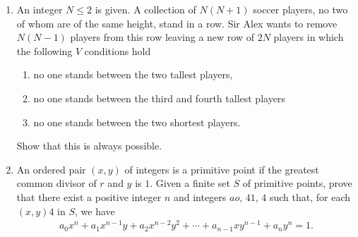 \documentclass[12pt,-letter paper]{article}
\begin{document}
\begin{enumerate}
\item An integer $N\leq2$ is given. A collection of $N(N+1)$ soccer players, no two of whom are of the same height, stand in a row. Sir Alex wants to remove $N(N-1)$ players from this row leaving a new row of $2N$ players in which the following $V$ conditions hold
	\begin{enumerate}[label=(\arabic *)]
		\item no one stands between the two tallest players,                 \item no one stands between the third and fourth tallest players
	
\item no one stands between the two shortest players.
	\end{enumerate}
	Show that this is always possible.
	
\item An ordered pair $(x, y)$ of integers is a primitive point if the greatest common divisor of $r$ and $y$ is $1$. Given a finite set $S$ of primitive points, prove that there exist a positive integer $n$ and integers $ao$, $41$, $4$ such that, for each $(x, y)4$ in $S$, we have
	\begin{align}a_0x^n + a_1x^{n-1}y + a_2x^{n-2}y^2 + \cdots + a_{n-1}xy^{n-1} + a_ny^n = 1.\end{align}




\end{enumerate}
\end{document}
